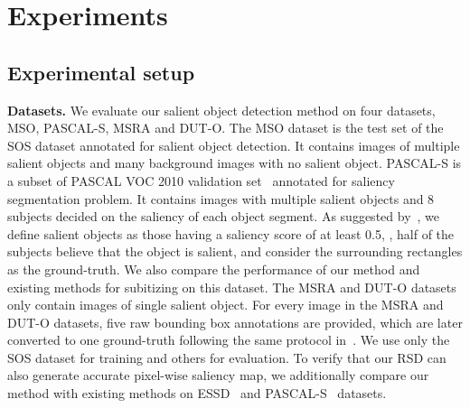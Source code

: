 \documentclass[10pt,twocolumn,letterpaper]{article}
\begin{document}
\vspace{-2mm}
\section{Experiments}
\subsection{Experimental setup}

{\flushleft \textbf{Datasets.}} We evaluate our salient object detection method on {four} datasets, MSO\cite{DBLP:conf/cvpr/ZhangMSSBLSPM15}, {PASCAL-S\cite{li2014secrets}}, MSRA\cite{liu2011learning} and DUT-O\cite{yang2013saliency}. The MSO dataset is the test set of the SOS dataset annotated for salient object detection. It contains images of multiple salient objects and many background images with no salient object. {PASCAL-S is a subset of PASCAL VOC 2010 validation set~\cite{Everingham15} annotated for saliency segmentation problem. It contains images with multiple salient objects and 8 subjects decided on the saliency of each object segment. As suggested by~\cite{li2014secrets}, we define salient objects as those having a saliency score of at least 0.5, \ie, half of the subjects believe that the object is salient, and consider the surrounding rectangles as the ground-truth.}
We also compare the performance of our method and existing methods for subitizing on this dataset. The MSRA and DUT-O datasets only contain images of single salient object. For every image in the MSRA and DUT-O datasets, five raw bounding box annotations are provided, which are later converted to one ground-truth following the same protocol in~\cite{zhang2015SOD}. We use only the SOS dataset for training and others for evaluation. To verify that our RSD can also generate accurate pixel-wise saliency map, we additionally compare our method with existing methods on ESSD~\cite{hs} and PASCAL-S~\cite{li2014secrets} datasets. 
\end{document}
